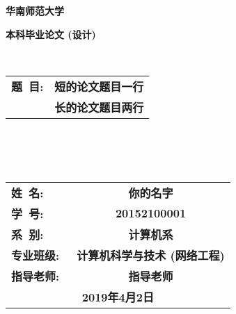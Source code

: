 \thispagestyle{empty}

\begin{center}
  \textbf{华南师范大学}
\end{center}

\begin{center}
\textbf{本科毕业论文 (设计)}
\end{center}

\begin{center}
\ \\
\end{center}

\begin{table}[ht]
  \setlength\extrarowheight{10pt}
  \centering
  \begin{tabular}{lc}
  \textbf{题\ 目:}  & \textbf{短的论文题目一行}            \\ \cline{2-2}
  \textbf{}  & \textbf{长的论文题目两行}            \\ \cline{2-2}
  \end{tabular}
\end{table}

\begin{center}
\ \\\ \\\ \\
\end{center}
\begin{spacing}{1.8}

\begin{table}[ht]
  \setlength\extrarowheight{10pt}
  \centering
  \begin{tabular}{lc}
  \textbf{姓\ 名:}  & \textbf{你的名字}             \\ \cline{2-2} 
  \textbf{学\ 号:}  & \textbf{20152100001}     \\ \cline{2-2} 
  \textbf{系\ 别:}  & \textbf{计算机系}            \\ \cline{2-2} 
  \textbf{专业班级:\ } & \textbf{计算机科学与技术 (网络工程)} \\ \cline{2-2} 
  \textbf{指导老师:\ } & \textbf{指导老师}             \\ \cline{2-2} 
  \multicolumn{2}{c}{\textbf{2019年4月2日}}   
  \end{tabular}
\end{table}

\end{spacing}
\afterpage{\blankpage}
\newpage